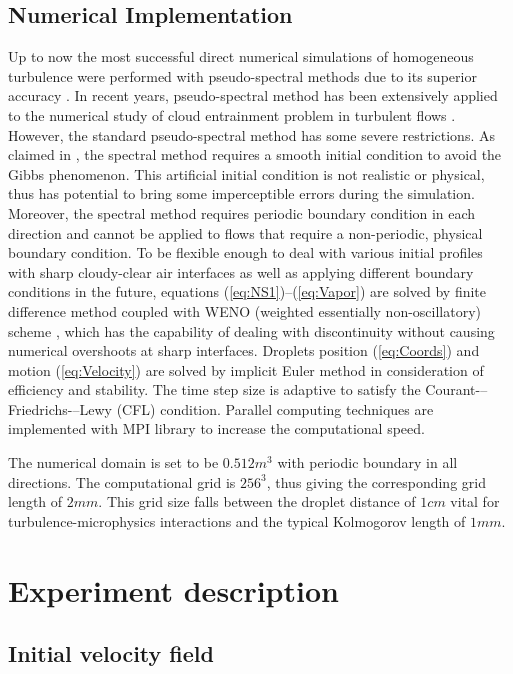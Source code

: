 \documentclass[draft,jgrga]{AGUTeX}
\begin{document}
\begin{article}
\subsection{Numerical Implementation}
Up to now the most successful direct numerical simulations of homogeneous 
turbulence were performed with pseudo-spectral methods due to its 
superior accuracy \cite{Rogallo81,Orszag72}. In recent years, pseudo-spectral 
method has been extensively applied to the numerical study of cloud 
entrainment problem in turbulent flows \cite{And04,Celani05,Kumar11}. However, the standard pseudo-spectral method has some severe restrictions. 
As claimed in \cite{Kumar11}, the spectral method requires a smooth initial condition to avoid the Gibbs phenomenon. This artificial initial condition is not realistic or physical, thus has potential to bring some imperceptible errors during the simulation. Moreover, the spectral method requires periodic boundary condition in each direction and cannot be applied to flows that require a non-periodic, physical boundary condition. To be flexible enough to deal with various initial profiles with sharp cloudy-clear air interfaces as well as applying different boundary conditions in the future, equations (\ref{eq:NS1})--(\ref{eq:Vapor}) are solved by finite difference method coupled with WENO (weighted essentially non-oscillatory) scheme \cite{WENO96}, which has the capability of dealing with discontinuity without causing numerical overshoots at sharp interfaces. Droplets position (\ref{eq:Coords}) and motion (\ref{eq:Velocity}) are solved by implicit Euler method in consideration of efficiency and stability. The time step size is adaptive to satisfy the Courant-–Friedrichs-–Lewy (CFL) condition. Parallel computing techniques are implemented with MPI library to increase the computational speed.

The numerical domain is set to be $0.512m^{3}$ with periodic boundary
in all directions. The computational grid is $256^{3}$, thus
giving the corresponding grid length of $2mm$. This grid size falls
between the droplet distance of $1cm$ vital for turbulence-microphysics 
interactions and the typical Kolmogorov length of $1mm$.

\section{Experiment description}

\subsection{Initial velocity field}


\end{article}
\end{document}
